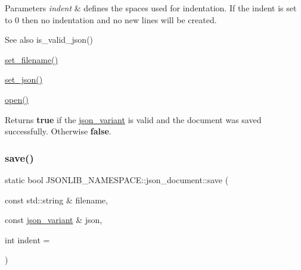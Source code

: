 \begin{DoxyParams}{Parameters}
{\em indent} & defines the spaces used for indentation. If the indent is set to 0 then no indentation and no new lines will be created. \\
\hline
\end{DoxyParams}
\begin{DoxySeeAlso}{See also}
is\+\_\+valid\+\_\+json() 

\hyperlink{classJSONLIB__NAMESPACE_1_1json__document_acc406344661e361c75ac7bc307057712}{set\+\_\+filename()} 

\hyperlink{classJSONLIB__NAMESPACE_1_1json__document_a5a72e4dc0b37b95c70baefad930b5b71}{set\+\_\+json()} 

\hyperlink{classJSONLIB__NAMESPACE_1_1json__document_a08e509059e628742f35716dddce2d740}{open()} 
\end{DoxySeeAlso}
\begin{DoxyReturn}{Returns}
{\bfseries true} if the \hyperlink{classJSONLIB__NAMESPACE_1_1json__variant}{json\+\_\+variant} is valid and the document was saved successfully. Otherwise {\bfseries false}. 
\end{DoxyReturn}
\mbox{\label{classJSONLIB__NAMESPACE_1_1json__document_a3742c9b58495c2803cef4495bf49a191}} 
\subsubsection{\texorpdfstring{save()}{save()}\hspace{0.1cm}{\footnotesize\ttfamily [4/6]}}
{\footnotesize\ttfamily static bool J\+S\+O\+N\+L\+I\+B\+\_\+\+N\+A\+M\+E\+S\+P\+A\+C\+E\+::json\+\_\+document\+::save (\begin{DoxyParamCaption}\item[{const std\+::string \&}]{filename,  }\item[{const \hyperlink{classJSONLIB__NAMESPACE_1_1json__variant}{json\+\_\+variant} \&}]{json,  }\item[{int}]{indent = {} }\end{DoxyParamCaption})\hspace{0.3cm}{\ttfamily [static]}}



